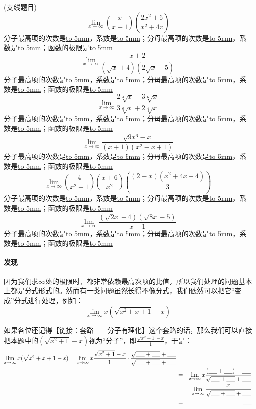 \documentclass[UTF8]{ctexart}
\begin{document}
(支线题目)
\[{\lim_{x \to \infty} (\frac{x}{x+1})(\frac{2x^2+6}{x^2+4x}) }\]
分子最高项的次数是\underline{\hbox to 5mm{}}，系数是\underline{\hbox to 5mm{}}；分母最高项的次数是\underline{\hbox to 5mm{}}，系数是\underline{\hbox to 5mm{}}；函数的极限是\underline{\hbox to 5mm{}}
\[{\lim_{x \to \infty} \frac{x+2}{(\sqrt{x} + 4)(2\sqrt{x} - 5)}}\]
分子最高项的次数是\underline{\hbox to 5mm{}}，系数是\underline{\hbox to 5mm{}}；分母最高项的次数是\underline{\hbox to 5mm{}}，系数是\underline{\hbox to 5mm{}}；函数的极限是\underline{\hbox to 5mm{}}
\[{\lim_{x \to \infty} \frac{2\sqrt[4]{x}-3\sqrt[6]{x}}{3\sqrt[6]{x}+2\sqrt[4]{x}}}\]
分子最高项的次数是\underline{\hbox to 5mm{}}，系数是\underline{\hbox to 5mm{}}；分母最高项的次数是\underline{\hbox to 5mm{}}，系数是\underline{\hbox to 5mm{}}；函数的极限是\underline{\hbox to 5mm{}}
\[{\lim_{x \to \infty} \frac{\sqrt{9x^6-x}}{(x+1)(x^2-x+1)}}\]
分子最高项的次数是\underline{\hbox to 5mm{}}，系数是\underline{\hbox to 5mm{}}；分母最高项的次数是\underline{\hbox to 5mm{}}，系数是\underline{\hbox to 5mm{}}；函数的极限是\underline{\hbox to 5mm{}}
\[{\lim_{x \to \infty} (\frac{4}{x^2+1})(\frac{x+6}{x^2})(\frac{(2-x)(x^2+4x-4)}{3})}\]
分子最高项的次数是\underline{\hbox to 5mm{}}，系数是\underline{\hbox to 5mm{}}；分母最高项的次数是\underline{\hbox to 5mm{}}，系数是\underline{\hbox to 5mm{}}；函数的极限是\underline{\hbox to 5mm{}}
\[{\lim_{x \to \infty} \frac{(\sqrt{2x} + 4)(\sqrt{8x} - 5)}{x-1}}\]
分子最高项的次数是\underline{\hbox to 5mm{}}，系数是\underline{\hbox to 5mm{}}；分母最高项的次数是\underline{\hbox to 5mm{}}，系数是\underline{\hbox to 5mm{}}；函数的极限是\underline{\hbox to 5mm{}}

\paragraph{发现}
因为我们求$\infty$处的极限时，都非常依赖最高次项的比值，所以我们处理的问题基本上都是分式形式的。然而有一类问题虽然长得不像分式，我们依然可以把它“变成”分式进行处理，例如：
\[{\lim_{x \to \infty} x(\sqrt{x^2+x+1} - x)}\]

如果各位还记得【链接：套路——分子有理化】这个套路的话，那么我们可以直接把本题中的$(\sqrt{x^2+1}-x)$视为“分子”，即$\frac{\sqrt{x^2+1}-x}{1}$，于是：
\begin{eqnarray*}
{\lim_{x \to \infty} x(\sqrt{x^2+x+1} - x)} = {\lim_{x \to \infty} x\frac{\sqrt{x^2+1}-x}{1} \cdot \frac{\sqrt{\underline{\hbox to 5mm{}}+\underline{\hbox to 5mm{}}}+\underline{\hbox to 5mm{}}}{\sqrt{\underline{\hbox to 5mm{}} + \underline{\hbox to 5mm{}}}+\underline{\hbox to 5mm{}}}}\\
& = & {\lim_{x \to \infty} x\frac{( \underline{\hbox to 5mm{}}+\underline{\hbox to 5mm{}} ) - \underline{\hbox to 5mm{}}}{\sqrt{\underline{\hbox to 5mm{}} + \underline{\hbox to 5mm{}}} + \underline{\hbox to 5mm{}}} }\\
& = & {\lim_{x \to \infty} \frac{x}{\sqrt{\underline{\hbox to 5mm{}}+\underline{\hbox to 5mm{}}}+\underline{\hbox to 5mm{}}}}\\
& = & \underline{\hbox to 5mm{}}
\end{eqnarray*}
\end{document}
